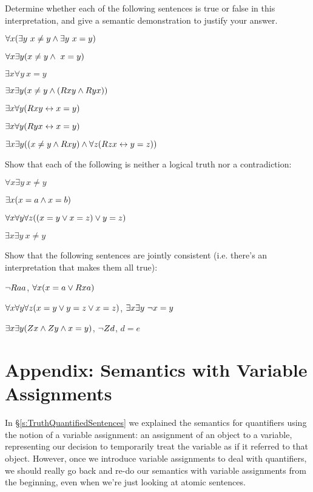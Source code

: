 \noindent Determine whether each of the following sentences is true or false in this interpretation, and give a semantic demonstration to justify your answer.
\begin{earg}
\item $\forall x (\exists y \ x \neq y \wedge \exists y \ x = y)$
\item $\forall x \exists y ( x \neq y \wedge \ x = y)$
\item $\exists x \forall y \ x = y$
\item $\exists x \exists y (x \neq y \wedge  (Rxy \wedge Ryx))$
\item $\exists x \forall y(Rxy \leftrightarrow x = y)$
\item $\exists x \forall y(Ryx \leftrightarrow x = y)$
\item $\exists x \exists y((x \neq y \wedge Rxy) \wedge \forall z(Rzx \leftrightarrow y = z))$
\end{earg}


\problempart
\label{pr.Contingent}
Show that each of the following is neither a logical truth nor a contradiction:
\begin{earg}
\item $\forall x \exists y \ x \neq y$
\item $\exists x (x = a \wedge x = b)$
\item $\forall x \forall y \forall z((x = y \vee x = z) \vee y = z)$
\item $\exists x \exists y \ x \neq y$
\end{earg}
Show that the following sentences are jointly consistent (i.e. there's an interpretation that makes them all true):
\begin{earg}
\setcounter{eargnum}{2}
\item $\neg Raa$, $\forall x (x=a \vee Rxa)$
\item $\forall x\forall y\forall z(x=y \vee y=z \vee x=z)$, $\exists x\exists y\ \neg x= y$
\item $\exists x\exists y(Zx \wedge Zy \wedge x=y)$, $\neg Zd$, $d=e$
\end{earg}







\section{Appendix: Semantics with Variable Assignments}\label{s:semanticsappendix}

In \S\ref{s:TruthQuantifiedSentences} we explained the semantics for quantifiers using the notion of a variable assignment: an assignment of an object to a variable, representing our decision to temporarily treat the variable as if it referred to that object.  However, once we introduce variable assignments to deal with quantifiers, we should really go back and re-do our semantics with variable assignments from the beginning, even when we're just looking at atomic sentences.


